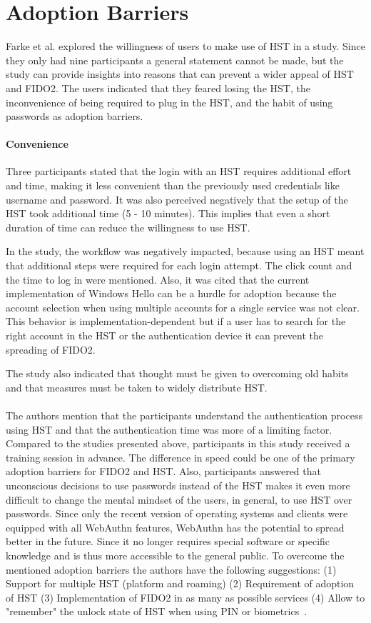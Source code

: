 \documentclass[runningheads]{llncs}
\begin{document}
\section{Adoption Barriers}
Farke et al. explored the willingness of users to make use of HST in a study. Since they only had nine participants a general statement cannot be made, but the study can provide insights into reasons that can prevent a wider appeal of HST and FIDO2. The users indicated that they feared losing the HST, the inconvenience of being required to plug in the HST, and the habit of using passwords as adoption barriers.

\paragraph{Convenience}
Three participants stated that the login with an HST requires additional effort and time, making it less convenient than the previously used credentials like username and password. It was also perceived negatively that the setup of the HST took additional time (5 - 10 minutes). This implies that even a short duration of time can reduce the willingness to use HST.

In the study, the workflow was negatively impacted, because using an HST meant that additional steps were required for each login attempt. The click count and the time to log in were mentioned. Also, it was cited that the current implementation of Windows Hello can be a hurdle for adoption because the account selection when using multiple accounts for a single service was not clear. This behavior is implementation-dependent but if a user has to search for the right account in the HST or the authentication device it can prevent the spreading of FIDO2. 

The study also indicated that thought must be given to overcoming old habits and that measures must be taken to widely distribute HST.

\paragraph{}
The authors mention that the participants understand the authentication process using HST and that the authentication time was more of a limiting factor. Compared to the studies presented above, participants in this study received a training session in advance. The difference in speed could be one of the primary adoption barriers for FIDO2 and HST. Also, participants answered that unconscious decisions to use passwords instead of the HST makes it even more difficult to change the mental mindset of the users, in general, to use HST over passwords. Since only the recent version of operating systems and clients were equipped with all WebAuthn features, WebAuthn has the potential to spread better in the future. Since it no longer requires special software or specific knowledge and is thus more accessible to the general public. To overcome the mentioned adoption barriers the authors have the following suggestions: (1) Support for multiple HST (platform and roaming) (2) Requirement of adoption of HST (3) Implementation of FIDO2 in as many as possible services (4) Allow to "remember" the unlock state of HST when using PIN or biometrics~\cite{255646}.
\end{document}
